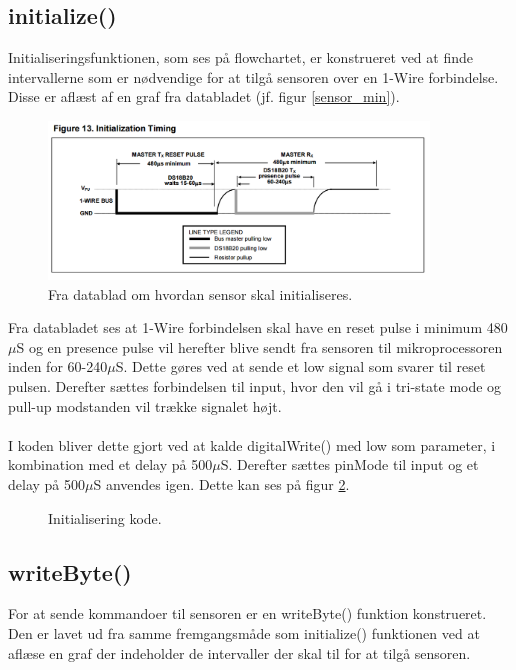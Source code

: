 \subsection{initialize()}
Initialiseringsfunktionen, som ses på flowchartet, er konstrueret ved at finde intervallerne som er nødvendige for at tilgå sensoren over en 1-Wire forbindelse. Disse er aflæst af en graf fra databladet (jf. figur \ref{sensor_min}).
\begin{figure}[h!]
  \centering
  \includegraphics[width=0.9\textwidth]{figures/Initialization_timing.png}
  \caption{Fra datablad om hvordan sensor skal initialiseres.}
  \label{sensor_init}
\end{figure}

Fra databladet ses at 1-Wire forbindelsen skal have en reset pulse i minimum 480$\mu$S og en presence pulse vil herefter blive sendt fra sensoren til mikroprocessoren inden for 60-240$\mu$S. Dette gøres ved at sende et low signal som svarer til reset pulsen. Derefter sættes forbindelsen til input, hvor den vil gå i tri-state mode og pull-up modstanden vil trække signalet højt. 
\\
\\
I koden bliver dette gjort ved at kalde digitalWrite() med low som parameter, i kombination med et delay på 500$\mu$S. Derefter sættes pinMode til input og et delay på 500$\mu$S anvendes igen. Dette kan ses på figur \ref{sensor_kode}.

\begin{figure}[h!]
  \centering
  \caption{Initialisering kode.}
  \label{sensor_kode}
\end{figure}

\subsection{writeByte()}
For at sende kommandoer til sensoren er en writeByte() funktion konstrueret. Den er lavet ud fra samme fremgangsmåde som initialize() funktionen ved at aflæse en graf der indeholder de intervaller der skal til for at tilgå sensoren.

